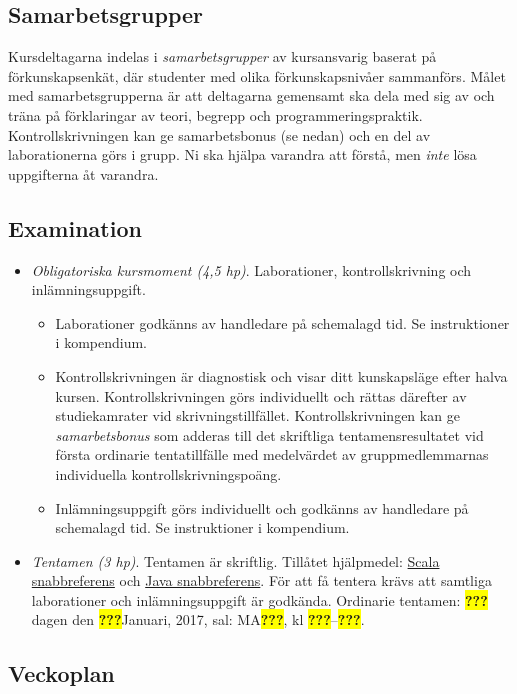 \documentclass[a4paper,12pt,oneside]{memoir}
\newcommand{\TBD}{\colorbox{yellow}{\textbf{???}}}
\begin{document}
\subsection{Samarbetsgrupper}\label{samarbetsgrupper}

Kursdeltagarna indelas i \emph{samarbetsgrupper} av kursansvarig baserat
på förkunskapsenkät, där studenter med olika förkunskapsnivåer
sammanförs. Målet med samarbetsgrupperna är att deltagarna gemensamt ska
dela med sig av och träna på förklaringar av teori, begrepp och
programmeringspraktik. Kontrollskrivningen kan ge samarbetsbonus (se
nedan) och en del av laborationerna görs i grupp. Ni ska hjälpa varandra att
förstå, men \emph{inte} lösa uppgifterna åt varandra.

\subsection{Examination}\label{examination}

\begin{itemize}
\item
  \emph{Obligatoriska kursmoment (4,5 hp)}. Laborationer,
  kontrollskrivning och inlämningsuppgift.

  \begin{itemize}
  \item
    Laborationer godkänns av handledare på schemalagd tid. Se
    instruktioner i kompendium.
  \item
    Kontrollskrivningen är diagnostisk och visar ditt kunskapsläge efter
    halva kursen. Kontrollskrivningen görs individuellt och rättas
    därefter av studiekamrater vid skrivningstillfället.
    Kontrollskrivningen kan ge \emph{samarbetsbonus} som adderas till
    det skriftliga tentamensresultatet vid första ordinarie
    tentatillfälle med medelvärdet av gruppmedlemmarnas individuella
    kontrollskrivningspoäng.
  \item
    Inlämningsuppgift görs individuellt och godkänns av handledare på
    schemalagd tid. Se instruktioner i kompendium.
  \end{itemize}

\item
  \emph{Tentamen (3 hp)}. Tentamen är skriftlig. Tillåtet hjälpmedel:
  \href{http://cs.lth.se/eda016/scalaref}{Scala snabbreferens} och 
  \href{http://cs.lth.se/eda016/javaref}{Java snabbreferens}. 
  För att få tentera krävs att samtliga laborationer och inlämningsuppgift är godkända.
   Ordinarie tentamen: \TBD dagen den \TBD Januari, 2017, sal: MA\TBD, kl \TBD--\TBD.
\end{itemize}

\clearpage

\subsection*{Veckoplan}

{\fontsize{11pt}{16pt}\selectfont 

}
\end{document}
